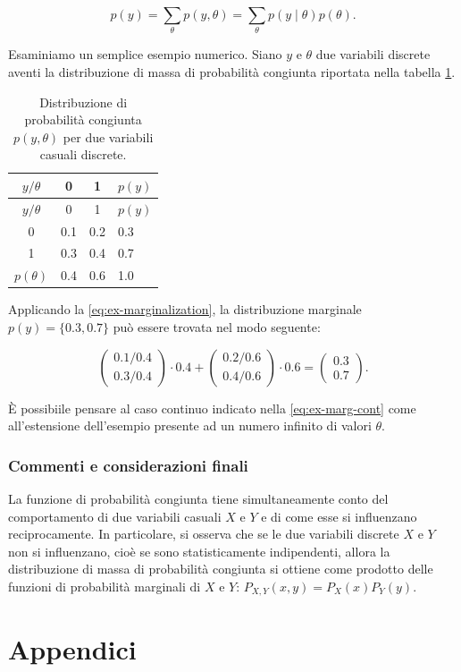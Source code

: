 \documentclass[
  11pt,
]{krantz}
\theoremstyle{definition}
\theoremstyle{definition}
\theoremstyle{definition}
\theoremstyle{definition}
\theoremstyle{remark}
\begin{document}
\begin{equation}
p(y) = \sum_{\theta} p(y, \theta) = \sum_{\theta} p(y \mid \theta) p(\theta).
\label{eq:ex-marginalization}
\end{equation}

Esaminiamo un semplice esempio numerico. Siano \(y\) e \(\theta\) due variabili discrete aventi la distribuzione di massa di probabilità congiunta riportata nella tabella \ref{tab:ex-marg}.

\begin{longtable}[]{@{}cccl@{}}
\caption{\label{tab:ex-marg} Distribuzione di probabilità congiunta \(p(y, \theta)\) per due variabili casuali discrete.}\tabularnewline
\toprule
\(y / \theta\) & 0 & 1 & \(p(y)\) \\
\midrule
\endfirsthead
\toprule
\(y / \theta\) & 0 & 1 & \(p(y)\) \\
\midrule
\endhead
0 & 0.1 & 0.2 & 0.3 \\
1 & 0.3 & 0.4 & 0.7 \\
\(p(\theta)\) & 0.4 & 0.6 & 1.0 \\
\bottomrule
\end{longtable}

Applicando la \eqref{eq:ex-marginalization}, la distribuzione marginale \(p(y) = \{0.3, 0.7\}\) può essere trovata nel modo seguente:

\[
\begin{pmatrix}
    0.1 / 0.4 \\
    0.3 / 0.4
\end{pmatrix} \cdot 0.4 +
\begin{pmatrix}
    0.2 / 0.6 \\
    0.4 / 0.6
\end{pmatrix} \cdot 0.6 =
\begin{pmatrix}
    0.3 \\
   0.7
\end{pmatrix}.
\]

È possibiile pensare al caso continuo indicato nella \eqref{eq:ex-marg-cont} come all'estensione dell'esempio presente ad un numero infinito di valori \(\theta\).

\hypertarget{commenti-e-considerazioni-finali-3}{%
\section*{Commenti e considerazioni finali}\label{commenti-e-considerazioni-finali-3}}


La funzione di probabilità congiunta tiene simultaneamente conto del comportamento di due variabili casuali \(X\) e \(Y\) e di come esse si influenzano reciprocamente. In particolare, si osserva che se le due variabili discrete \(X\) e \(Y\) non si influenzano, cioè se sono statisticamente indipendenti, allora la distribuzione di massa di probabilità congiunta si ottiene come prodotto delle funzioni di probabilità marginali di \(X\) e \(Y\): \(P_{X, Y}(x, y) = P_X(x) P_Y(y)\).

\mainmatter

\hypertarget{part-appendici}{%
\part{Appendici}\label{part-appendici}}

\hypertarget{appendix-appendici}{%
\appendix {}}


  

\printindex
\end{document}
